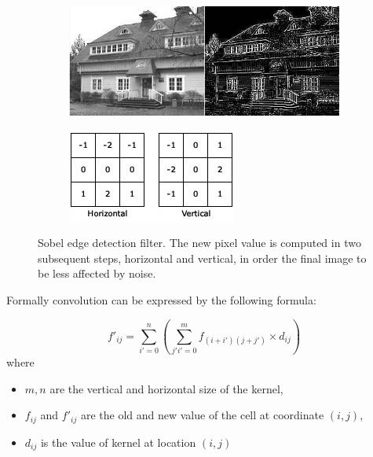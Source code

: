 \begin{figure}[!htb]
	\begin{subfigure}{1.0\textwidth}
		\includegraphics[width=\linewidth]{./images/opencal/sobel_example}
	\end{subfigure}
	
	\endminipage\hfill
	\begin{subfigure}{1.0\textwidth}
		\includegraphics[width=\linewidth]{./images/opencal/conv-sobel}	
	\end{subfigure}
	\endminipage\hfill
	\caption{Sobel edge detection filter. The new pixel value is computed in two subsequent steps, horizontal and vertical, in order the final image to be less affected by noise.}
	\label{fig:sobel}
\end{figure}

Formally convolution can be expressed by the following formula:

\begin{equation*}
   f'_{ij} = \sum_{i'=0}^n (\sum_{j'i'=0}^m f_{(i+i')(j+j')}\times d_{ij})
\end{equation*}
where 
\begin{itemize}
	\item $m,n$ are the  vertical and horizontal size of the kernel,
	\item $f_{ij}$ and $f'_{ij}$ are the old and new value of the cell at coordinate $(i,j)$,
	\item $d_{ij}$ is the value of kernel at location $(i,j)$ 
\end{itemize}


